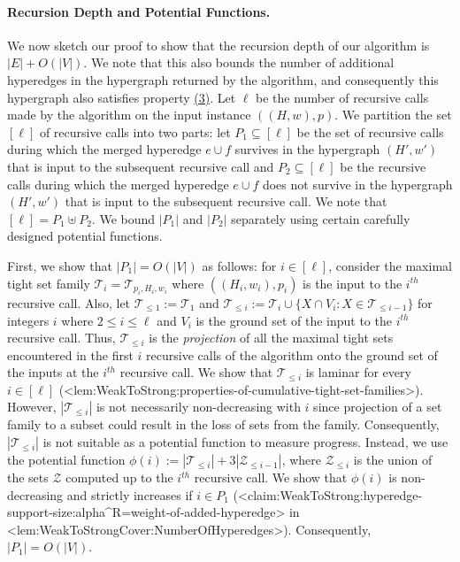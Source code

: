 \documentclass{article}
\def\Cref#1{<#1>}%
\newcommand{\zeros}{\ensuremath{\mathcal{Z}}\xspace}
\newcommand{\shubhang}[1]{{\color{blue}[{\tiny Shubhang: \bf #1}]\marginpar{\color{blue}*}}}
\providecommand{\calT}{\mathcal{T}}
\begin{document}
\paragraph{Recursion Depth and Potential Functions.} We now sketch our proof to show that the recursion depth of our algorithm is $|E|+O(|V|)$. We note that this also bounds the number of additional hyperedges in the hypergraph returned by the algorithm, and consequently this hypergraph also satisfies property \hyperlink{WeakToStrong(3)}{(3)}. Let $\ell$ be the number of recursive calls made by the algorithm on the input instance $((H, w), p)$. 
We partition 
the set $[\ell]$ of recursive calls into two parts: let $P_1\subseteq [\ell]$ be the set of recursive calls during which 
the merged hyperedge $e\cup f$ survives in the hypergraph $(H', w')$ that is input to the subsequent recursive call and 
$P_2\subseteq [\ell]$ be the recursive calls during which 
the merged hyperedge $e\cup f$ does not survive in the hypergraph $(H', w')$ that is input to the subsequent recursive call. 
We note that $[\ell]=P_1\uplus P_2$. We bound $|P_1|$ and $|P_2|$ separately using certain carefully designed potential functions.

First, we show that $|P_1|=O(|V|)$ as follows: for $i\in [\ell]$, consider the maximal tight set family $\mathcal{T}_i=\mathcal{T}_{p_i, H_i, w_i}$ where $((H_i, w_i), p_i)$ is the input to the $i^{th}$ recursive call. Also, let $\mathcal{T}_{\le 1}:=\mathcal{T}_1$ and $\mathcal{T}_{\le i}:=\mathcal{T}_{i}\cup \{X\cap V_i: X\in \mathcal{T}_{\le i-1}\}$ for integers $i$ where $2 \le i\le \ell$ and $V_i$ is the ground set of the input to the $i^{th}$ recursive call. Thus, $\calT_{\leq i}$ is the \emph{projection} of all the maximal tight sets encountered in the first $i$ recursive calls of the algorithm onto the ground set of the inputs at the $i^{th}$ recursive call. We show that $\mathcal{T}_{\le i}$ is laminar for every $i\in [\ell]$ (\Cref{lem:WeakToStrong:properties-of-cumulative-tight-set-families}). 
However, $|\mathcal{T}_{\le i}|$ is not necessarily non-decreasing with $i$ since projection of a set family to a subset could result in the loss of sets from the family. Consequently, $|\mathcal{T}_{\le i}|$ is not suitable as a potential function to measure progress. Instead, we use the potential function $\phi(i):=|\mathcal{T}_{\le i}|+3|\zeros_{\le i-1}|$, where $\zeros_{\le i}$ is the union of the sets $\zeros$ computed up to the $i^{th}$ recursive call. We show that $\phi(i)$ is non-decreasing and strictly increases if $i\in P_1$ (\Cref{claim:WeakToStrong:hyperedge-support-size:alpha^R=weight-of-added-hyperedge} in \Cref{lem:WeakToStrongCover:NumberOfHyperedges}). Consequently, $|P_1|=O(|V|)$.
\end{document}
